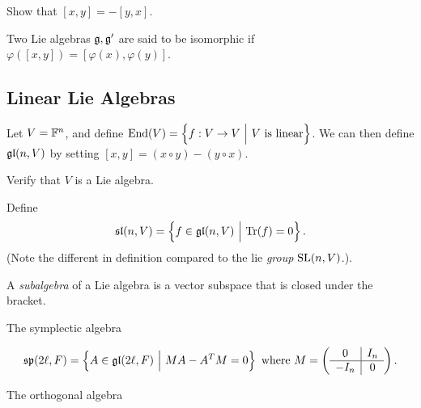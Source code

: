 
Show that \([x, y] = -[y,x]\). 


Two Lie algebras \({\mathfrak{g}}, {\mathfrak{g}}'\) are said to be isomorphic if
\(\varphi([x, y]) = [\varphi(x), \varphi(y)]\).

\hypertarget{linear-lie-algebras}{%
\subsection{Linear Lie Algebras}\label{linear-lie-algebras}}

Let \(V = {\mathbb{F}}^{n}\), and define
\(\mathrm{End}(V) = \left\{{f: V \to V {~\mathrel{\Big|}~} V \text{ is linear}}\right\}\).
We can then define \({\mathfrak{gl}}(n, V)\) by setting
\([x, y] = (x\circ y) - (y\circ x)\).


Verify that \(V\) is a Lie algebra. 


Define
\[{\mathfrak{sl}}(n, V) = \left\{{f \in {\mathfrak{gl}}(n, V) {~\mathrel{\Big|}~} \mathrm{Tr}(f) = 0}\right\}.\]
(Note the different in definition compared to the lie \emph{group}
\({\text{SL}}(n, V)\).). 


A \emph{subalgebra} of a Lie algebra is a vector subspace that is closed
under the bracket. 


The symplectic algebra

\begin{align*}
{\mathfrak{sp}}(2\ell, F) = \left\{{A \in {\mathfrak{gl}}(2\ell, F){~\mathrel{\Big|}~} MA-A^{T}M = 0}\right\} \text{ where }
M = \left(\begin{array}{c|c}{0} & {I_{n}} \\ \hline {-I_{n}} & {0}\end{array}\right)
.\end{align*}



The orthogonal algebra

